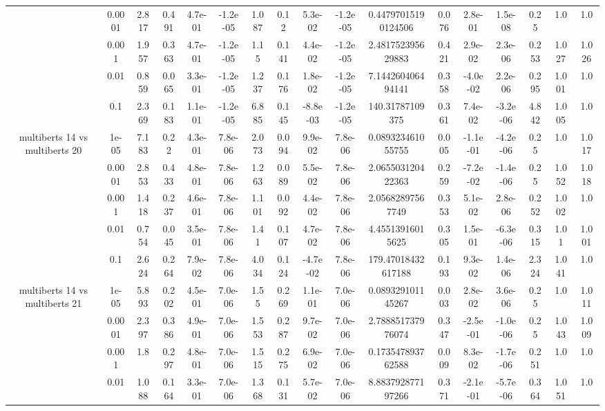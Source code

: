 \begin{tabular}{|c|c|c|c|c|c|c|c|c|c|c|c|c|c|c|c|c|}
 & 0.0001 & 2.817 & 0.491 & 4.7e-01 & -1.2e-05 & 1.087 & 0.12 & 5.3e-02 & -1.2e-05 & 0.44797015190124506 & 0.076 & 2.8e-01 & 1.5e-08 & 0.25 & 1.0 & 1.0 \\
 & 0.001 & 1.957 & 0.363 & 4.7e-01 & -1.2e-05 & 1.15 & 0.141 & 4.4e-02 & -1.2e-05 & 2.481752395629883 & 0.421 & 2.9e-02 & 2.3e-06 & 0.253 & 1.027 & 1.026 \\
 & 0.01 & 0.859 & 0.065 & 3.3e-01 & -1.2e-05 & 1.237 & 0.176 & 1.8e-02 & -1.2e-05 & 7.144260406494141 & 0.358 & -4.0e-02 & 2.2e-06 & 0.295 & 1.001 & 1.0 \\
 & 0.1 & 2.369 & 0.183 & 1.1e-01 & -1.2e-05 & 6.885 & 0.145 & -8.8e-03 & -1.2e-05 & 140.31787109375 & 0.361 & 7.4e-02 & -3.2e-06 & 4.842 & 1.005 & 1.0 \\
\hline
\multirow{5}{*}{multiberts 14 vs multiberts 20} & 1e-05 & 7.183 & 0.22 & 4.3e-01 & 7.8e-06 & 2.073 & 0.094 & 9.9e-02 & 7.8e-06 & 0.089323461055755 & 0.005 & -1.1e-01 & -4.2e-06 & 0.25 & 1.0 & 1.017 \\
 & 0.0001 & 2.853 & 0.433 & 4.8e-01 & 7.8e-06 & 1.263 & 0.089 & 5.5e-02 & 7.8e-06 & 2.065503120422363 & 0.259 & -7.2e-02 & -1.4e-06 & 0.25 & 1.052 & 1.018 \\
 & 0.001 & 1.418 & 0.237 & 4.6e-01 & 7.8e-06 & 1.101 & 0.092 & 4.4e-02 & 7.8e-06 & 2.05682897567749 & 0.353 & 5.1e-02 & 2.8e-06 & 0.252 & 1.002 & 1.0 \\
 & 0.01 & 0.754 & 0.045 & 3.5e-01 & 7.8e-06 & 1.41 & 0.107 & 4.7e-02 & 7.8e-06 & 4.45513916015625 & 0.305 & 1.5e-01 & -6.3e-06 & 0.315 & 1.01 & 1.001 \\
 & 0.1 & 2.624 & 0.264 & 7.9e-02 & 7.8e-06 & 4.034 & 0.124 & -4.7e-02 & 7.8e-06 & 179.47018432617188 & 0.193 & 9.3e-02 & 1.4e-06 & 2.324 & 1.041 & 1.0 \\
\hline
\multirow{5}{*}{multiberts 14 vs multiberts 21} & 1e-05 & 5.893 & 0.202 & 4.5e-01 & 7.0e-06 & 1.55 & 0.269 & 1.1e-01 & 7.0e-06 & 0.089329101145267 & 0.003 & 2.8e-02 & 3.6e-06 & 0.25 & 1.0 & 1.011 \\
 & 0.0001 & 2.397 & 0.386 & 4.9e-01 & 7.0e-06 & 1.553 & 0.287 & 9.7e-02 & 7.0e-06 & 2.788851737976074 & 0.347 & -2.5e-01 & -1.0e-06 & 0.25 & 1.043 & 1.009 \\
 & 0.001 & 1.8 & 0.297 & 4.8e-01 & 7.0e-06 & 1.515 & 0.275 & 6.9e-02 & 7.0e-06 & 0.173547893762588 & 0.009 & 8.3e-02 & -1.7e-06 & 0.251 & 1.0 & 1.0 \\
 & 0.01 & 1.088 & 0.164 & 3.3e-01 & 7.0e-06 & 1.368 & 0.131 & 5.7e-02 & 7.0e-06 & 8.883792877197266 & 0.371 & -2.1e-01 & -5.7e-06 & 0.364 & 1.051 & 1.0 \\

\end{tabular}
